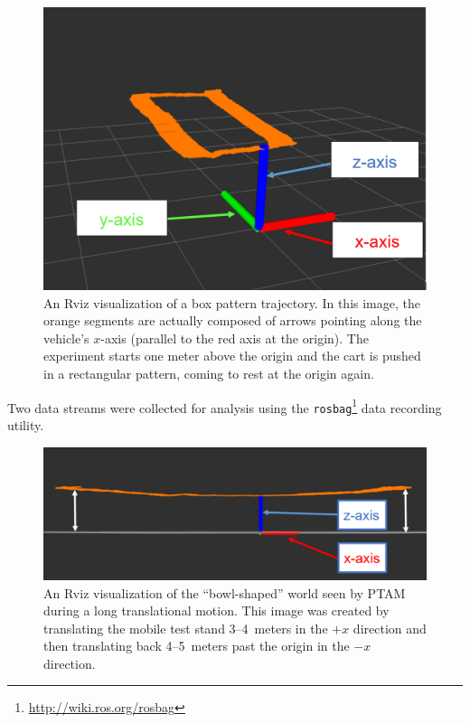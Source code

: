 \begin{figure}
  \centering
    \includegraphics[width=\textwidth]{good_box_5_cropped}
  \caption[Rviz Visualization of a Box Pattern Trajectory]{An Rviz visualization of a box pattern trajectory. In this image, the orange segments are actually composed of arrows pointing along the vehicle's $x$-axis (parallel to the red axis at the origin). The experiment starts one meter above the origin and the cart is pushed in a rectangular pattern, coming to rest at the origin again.}
  \label{fig:good_box}
\end{figure}


Two data streams were collected for analysis using the \texttt{rosbag}\footnote{\url{http://wiki.ros.org/rosbag}} data recording utility.

\begin{figure}
  \centering
    \includegraphics[width=\textwidth]{bowl-shaped_world}
  \caption[Rviz Visualization of Translational (Lens) Distortion]{An Rviz visualization of the ``bowl-shaped'' world seen by PTAM during a long translational motion. This image was created by translating the mobile test stand 3--4~meters in the $+x$ direction and then translating back 4--5~meters past the origin in the $-x$ direction.}
  \label{fig:bowl-shaped_world}
\end{figure}

